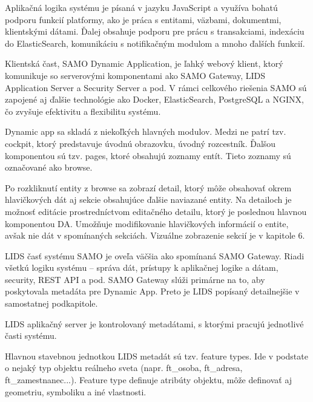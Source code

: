 Aplikačná logika systému je písaná v jazyku JavaScript a využíva bohatú podporu funkcií platformy, ako je práca s entitami, väzbami, dokumentmi, klientskými dátami. Ďalej obsahuje podporu pre prácu s transakciami, indexáciu do ElasticSearch, komunikáciu s notifikačným modulom a mnoho ďalších funkcií.





Klientská čast, SAMO Dynamic Application, je ľahký webový klient, ktorý komunikuje so serverovými komponentami ako SAMO Gateway, LIDS Application Server a Security Server a pod. V rámci celkového riešenia SAMO sú zapojené aj ďalšie technológie ako Docker, ElasticSearch, PostgreSQL a NGINX, čo zvyšuje efektivitu a flexibilitu systému.

Dynamic app sa skladá z niekoľkých hlavných modulov. Medzi ne patrí tzv. cockpit, ktorý predstavuje úvodnú obrazovku, úvodný rozcestník. Ďalšou komponentou sú tzv. pages, ktoré obsahujú zoznamy entít. Tieto zoznamy sú označované ako browse. 

Po rozkliknutí entity z browse sa zobrazí detail, ktorý môže obsahovať okrem hlavičkových dát aj sekcie obsahujúce ďalšie naviazané entity. Na detailoch je možnosť editácie prostredníctvom editačného detailu,  ktorý je poslednou hlavnou komponentou DA. Umožňuje modifikovanie hlavičkových informácií o entite, avšak nie dát v spomínaných sekciách. Vizuálne zobrazenie sekcií je v kapitole 6.



LIDS časť systému SAMO je oveľa väčšia ako spomínaná SAMO Gateway. Riadi všetkú logiku systému -- správa dát, prístupy k aplikačnej logike a dátam, security, REST API a pod. SAMO Gateway slúži primárne na to, aby poskytovala metadáta pre Dynamic App. Preto je LIDS popísaný detailnejšie v samostatnej podkapitole.

LIDS aplikačný server je kontrolovaný metadátami, s ktorými pracujú jednotlivé časti systému. 

Hlavnou stavebnou jednotkou LIDS metadát sú tzv. feature types. Ide v podstate o nejaký typ objektu reálneho sveta (napr. ft\_osoba, ft\_adresa, ft\_zamestnanec...). Feature type definuje atribúty objektu, môže definovať aj geometriu, symboliku a iné vlastnosti. 

